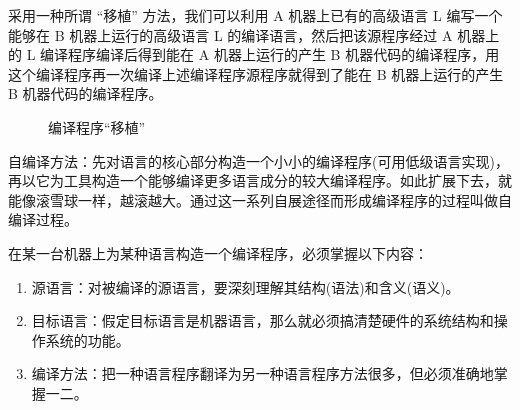 采用一种所谓 ``移植'' 方法，我们可以利用 A 机器上已有的高级语言 L 编写一个能够在 B 机器上运行的高级语言 L 的编译语言，然后把该源程序经过 A 机器上的 L 编译程序编译后得到能在 A 机器上运行的产生 B 机器代码的编译程序，用这个编译程序再一次编译上述编译程序源程序就得到了能在 B 机器上运行的产生 B 机器代码的编译程序。

\begin{figure}[H]
    \centering
    \caption{编译程序``移植''}
    \label{编译程序``移植''}
\end{figure}

自编译方法：先对语言的核心部分构造一个小小的编译程序(可用低级语言实现)，再以它为工具构造一个能够编译更多语言成分的较大编译程序。如此扩展下去，就能像滚雪球一样，越滚越大。通过这一系列自展途径而形成编译程序的过程叫做自编译过程。

在某一台机器上为某种语言构造一个编译程序，必须掌握以下内容：
\begin{enumerate}
    \item 源语言：对被编译的源语言，要深刻理解其结构(语法)和含义(语义)。
    \item 目标语言：假定目标语言是机器语言，那么就必须搞清楚硬件的系统结构和操作系统的功能。
    \item 编译方法：把一种语言程序翻译为另一种语言程序方法很多，但必须准确地掌握一二。
\end{enumerate}

\newpage